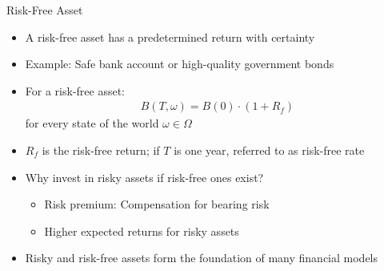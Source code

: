 \documentclass[10pt,handout]{beamer}
\begin{document}

\begin{frame}{Risk-Free Asset}
  \begin{itemize}[<+->]
    \item A risk-free asset has a predetermined return with certainty
    \item Example: Safe bank account or high-quality government bonds
    \item For a risk-free asset:
    \begin{align*}
      B(T, \omega) = B(0) \cdot (1 + R_f)
    \end{align*}
    for every state of the world $\omega \in \Omega$
    \item $R_f$ is the risk-free return; if $T$ is one year, referred to as risk-free rate
    \item Why invest in risky assets if risk-free ones exist?
      \begin{itemize}
        \item Risk premium: Compensation for bearing risk
        \item Higher expected returns for risky assets
      \end{itemize}
    \item Risky and risk-free assets form the foundation of many financial models
  \end{itemize}
\end{frame}
\end{document}
